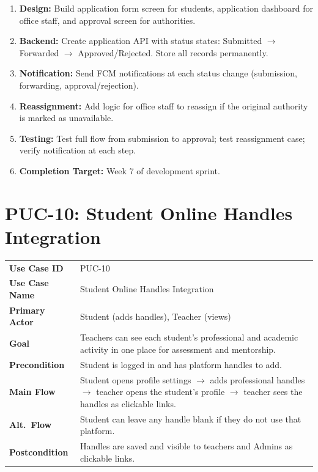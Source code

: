 \documentclass[12pt,a4paper]{article}
\begin{document}
\begin{tcolorbox}[planbox, title={Completion Plan --- PUC-09}]
\begin{enumerate}[leftmargin=*, label=\textbf{Step \arabic*:}, itemsep=4pt]
  \item \textbf{Design:} Build application form screen for students, application dashboard for office staff, and approval screen for authorities.
  \item \textbf{Backend:} Create application API with status states: Submitted $\rightarrow$ Forwarded $\rightarrow$ Approved/Rejected. Store all records permanently.
  \item \textbf{Notification:} Send FCM notifications at each status change (submission, forwarding, approval/rejection).
  \item \textbf{Reassignment:} Add logic for office staff to reassign if the original authority is marked as unavailable.
  \item \textbf{Testing:} Test full flow from submission to approval; test reassignment case; verify notification at each step.
  \item \textbf{Completion Target:} Week 7 of development sprint.
\end{enumerate}
\end{tcolorbox}

\newpage
\section{PUC-10: Student Online Handles Integration}

\begin{tcolorbox}[pucbox, title={Product Use Case --- PUC-10}]
\begin{tabularx}{\linewidth}{p{3.5cm} X}
\textbf{Use Case ID}    & PUC-10 \\
\textbf{Use Case Name}  & Student Online Handles Integration \\
\textbf{Primary Actor}  & Student (adds handles), Teacher (views) \\
\textbf{Goal}           & Teachers can see each student's professional and academic activity in one place for assessment and mentorship. \\
\textbf{Precondition}   & Student is logged in and has platform handles to add. \\
\textbf{Main Flow}      & Student opens profile settings $\rightarrow$ adds professional handles $\rightarrow$ teacher opens the student's profile $\rightarrow$ teacher sees the handles as clickable links. \\
\textbf{Alt.\ Flow}     & Student can leave any handle blank if they do not use that platform. \\
\textbf{Postcondition}  & Handles are saved and visible to teachers and Admins as clickable links. \\
\end{tabularx}
\end{tcolorbox}
\end{document}
